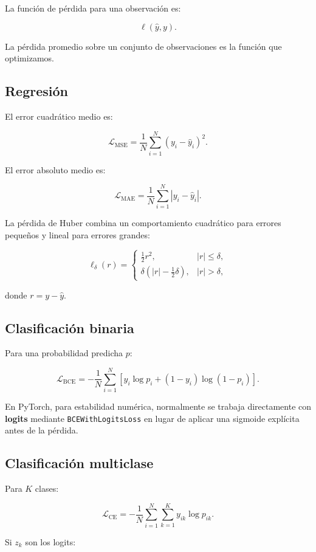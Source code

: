 \documentclass[
  letterpaper,
  DIV=11,
  numbers=noendperiod]{scrartcl}
\begin{document}
La función de pérdida para una observación es:

\[
\ell(\hat y,y).
\]

La pérdida promedio sobre un conjunto de observaciones es la función que
optimizamos.

\subsection{Regresión}\label{regresiuxf3n}

El error cuadrático medio es:

\[
\mathcal L_{\mathrm{MSE}}
=
\frac1N
\sum_{i=1}^{N}
(y_i-\hat y_i)^2.
\]

El error absoluto medio es:

\[
\mathcal L_{\mathrm{MAE}}
=
\frac1N
\sum_{i=1}^{N}
|y_i-\hat y_i|.
\]

La pérdida de Huber combina un comportamiento cuadrático para errores
pequeños y lineal para errores grandes:

\[
\ell_\delta(r)=
\begin{cases}
\frac12r^2,& |r|\leq\delta,\\[4pt]
\delta\left(|r|-\frac12\delta\right),& |r|>\delta,
\end{cases}
\]

donde \(r=y-\hat y\).

\subsection{Clasificación binaria}\label{clasificaciuxf3n-binaria}

Para una probabilidad predicha \(p\):

\[
\mathcal L_{\mathrm{BCE}}
=
-\frac1N
\sum_{i=1}^{N}
\left[
y_i\log p_i
+
(1-y_i)\log(1-p_i)
\right].
\]

En PyTorch, para estabilidad numérica, normalmente se trabaja
directamente con \textbf{logits} mediante \texttt{BCEWithLogitsLoss} en
lugar de aplicar una sigmoide explícita antes de la pérdida.

\subsection{Clasificación multiclase}\label{clasificaciuxf3n-multiclase}

Para \(K\) clases:

\[
\mathcal L_{\mathrm{CE}}
=
-\frac1N
\sum_{i=1}^{N}
\sum_{k=1}^{K}
y_{ik}\log p_{ik}.
\]

Si \(z_k\) son los logits:
\end{document}
